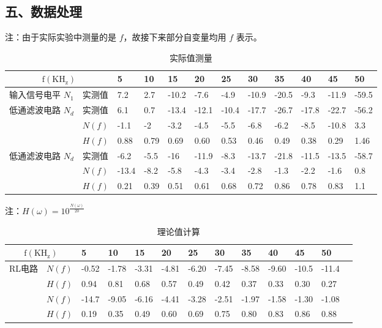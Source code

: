 \documentclass[dvipsnames, svgnames,a4paper,11pt]{article}
\begin{document}
\subsection*{五、数据处理}
注：由于实际实验中测量的是 $f$，故接下来部分自变量均用 $f$ 表示。
\begin{table}[H]
  \renewcommand\arraystretch{1.7}
  \centering
  \caption{实际值测量}
  \begin{tabularx}{\textwidth}{|p{}|X|X|X|X|X|X|X|X|X|X|X|}
    \hline
    \multicolumn{2}{|c|}{$\mathrm{f(KH_z)}$} & 5 & 10 & 15 & 20 & 25 & 30 & 35 & 40 & 45 & 50 \\
    \hline
    输入信号电平 $N_1$ & 实测值 & 7.2 & 2.7 & -10.2 & -7.6 & -4.9 & -10.9 & -20.5 & -9.3 & -11.9 & -59.5 \\
    \hline
    \multirow{3}{*}{低通滤波电路 $N_d$} & 实测值 & 6.1 & 0.7 & -13.4 & -12.1 & -10.4 & -17.7 & -26.7 & -17.8 & -22.7 & -56.2 \\
    \cline{2-12}
     & $N(f)$ & -1.1 & -2 & -3.2 & -4.5 & -5.5 & -6.8 & -6.2 & -8.5 & -10.8 & 3.3 \\
     \cline{2-12}
     & $H(f)$ & 0.88 &	0.79 & 0.69 &	0.60 & 0.53 &	0.46 & 0.49 &	0.38 & 0.29 &	1.46  \\
    \hline
    \multirow{3}{*}{低通滤波电路 $N_d$} & 实测值 & -6.2 & -5.5 & -16 & -11.9 & -8.3 & -13.7 & -21.8 & -11.5 & -13.5 & -58.7 \\
    \cline{2-12}
    & $N(f)$ & -13.4 &	-8.2 & -5.8 & -4.3 & -3.4	& -2.8 & -1.3 & -2.2 & -1.6 & 0.8
    \\
    \cline{2-12}
    & $H(f)$ & 0.21 & 0.39 & 0.51 & 0.61 &	0.68 & 0.72 &	0.86 & 0.78 &	0.83 & 1.1
    \\
    \hline
  \end{tabularx}
\end{table}
注：$H(\omega) = 10^{\frac{N(\omega)}{20}}$

\begin{table}[H]
  \renewcommand\arraystretch{1.7}
  \centering
  \caption{理论值计算}
  \begin{tabularx}{\textwidth}{|p{}|X|X|X|X|X|X|X|X|X|X|X|X|}
    \hline
    \multicolumn{2}{|c|}{$\mathrm{f(KH_z)}$} & 5 & 10 & 15 & 20 & 25 & 30 & 35 & 40 & 45 & 50 \\
    \hline
    \multirow{3}{*}{RL电路} & $N(f)$ & -0.52 & -1.78 & -3.31 & -4.81 & -6.20 & -7.45 & -8.58 & -9.60 & -10.5 & -11.4
    \\
    \cline{2-12}
     &$H(f)$ & 0.94 & 0.81 &	0.68 & 0.57	& 0.49 & 0.42 &	0.37 & 0.33 & 0.30 & 0.27
    \\
    \hline
    \multirow{3}{*}{RC电路} & $N(f)$ & -14.7 & -9.05 &	-6.16 & -4.41 &	-3.28 &	-2.51 & -1.97 & -1.58 &	-1.30 & -1.08
    \\
    \cline{2-12}
     & $H(f)$ & 0.19 & 0.35	& 0.49 & 0.60 &	0.69 & 0.75 &	0.80 & 0.83 &	0.86 & 0.88
    \\
    \hline
  \end{tabularx}
\end{table}
\end{document}
